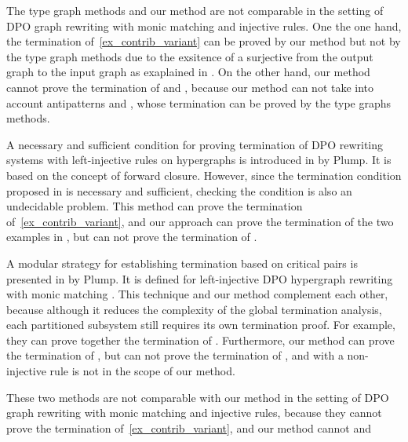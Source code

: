 The type graph methods and our method are not comparable in the setting of DPO graph rewriting with monic matching and injective rules. One the one hand, the termination of~\autoref{ex_contrib_variant} can be proved by our method but not by the type graph methods due to the exsitence of a surjective from the output graph to the input graph as exaplained in \cite[Example D.4]{EndrullisOverbeek2024Generalized}. On the other hand, our method cannot prove the termination of \cite[Example 1, Ad-hoc Routing Protocol]{bruggink2014termination} and \cite[Example D3]{EndrullisOverbeek2024Generalized}, because our method can not take into account antipatterns \cite[Remark 6.2]{Overbeek2024subgraph} and \cite[Examples D1, D2 and D3]{EndrullisOverbeek2024Generalized}, whose termination can be proved by the type graphs methods.

A necessary and sufficient condition for proving termination of DPO rewriting systems with left-injective rules on hypergraphs is introduced in \cite{Plump1995} by Plump. It is based on the concept of forward closure. However, since the termination condition proposed in \cite{Plump1995} is necessary and sufficient, checking the condition is also an undecidable problem. This method can prove the termination of~\autoref{ex_contrib_variant}, and our approach can prove the termination of the two examples in \cite{Plump1995}, but can not prove the termination of \cite[Example 4.1]{Plump1995}.

A modular strategy for establishing termination based on critical pairs is presented in \cite{plump2018modular} by Plump. It is defined for left-injective DPO hypergraph rewriting with monic matching \cite[Section 2.2]{plump2018modular}. 
This technique and our method complement each other, because although it reduces the complexity of the global termination analysis, each partitioned subsystem still requires its own termination proof. For example, they can prove together the termination of \cite[Example 4]{plump2018modular}.
Furthermore, our method can prove the termination of \cite[Examples 1 and 5]{plump2018modular}, but can not prove the termination of \cite[Example 4]{plump2018modular}, and \cite[Example 6]{plump2018modular} with a non-injective rule is not in the scope of our method. 

These two methods are not comparable with our method in the setting of DPO graph rewriting with monic matching and injective rules, because they cannot prove the termination of~\autoref{ex_contrib_variant}, and our method cannot   and


